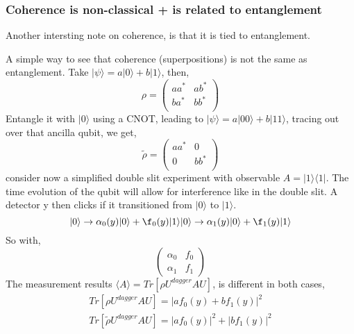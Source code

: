 \documentclass{article}
\begin{document}
\subsubsection{Coherence is non-classical + is related to entanglement}
Another intersting note on coherence, is that it is tied to entanglement. 

A simple way to see that coherence (superpositions) is not the same as entanglement. 
Take $|\psi\rangle=a|0\rangle+b|1\rangle$, then,
\begin{equation}
    \rho=\begin{pmatrix}
        aa^* & ab^* \\
        ba^*& bb^* \\
    \end{pmatrix}
\end{equation}
Entangle it with $|0\rangle$ using a CNOT, leading to $|\psi\rangle=a|00\rangle+b|11\rangle$, tracing out over that ancilla qubit, we get,
\begin{equation}
    \tilde{\rho}=\begin{pmatrix}
        aa^* & 0\\
        0& bb^* \\
    \end{pmatrix}
\end{equation}
consider now a simplified double slit experiment with observable $A=|1\rangle\langle 1|$. 
The time evolution of the qubit will allow for interference like in the double slit. A detector y then clicks if it transitioned from $|0\rangle$ to $|1\rangle$.  
\begin{equation}
    |0\rangle\rightarrow \alpha_0(y)|0\rangle+\f_0(y)|1\rangle\\
    |0\rangle\rightarrow \alpha_1(y)|0\rangle+\f_1(y)|1\rangle
\end{equation}
So with,
\begin{equation}
    \begin{pmatrix}
        \alpha_0 & f_0\\
        \alpha_1 & f_1
    \end{pmatrix}
\end{equation}
The measurement results $\langle A\rangle=Tr[\rho U^{dagger}AU]$, is different in both cases,
\begin{eqnarray}
    Tr[\rho U^{dagger}AU] = |af_0(y)+bf_1(y)|^2\\
    Tr[\tilde{\rho} U^{dagger}AU] = |af_0(y)|^2+|bf_1(y)|^2
\end{eqnarray}
\end{document}
